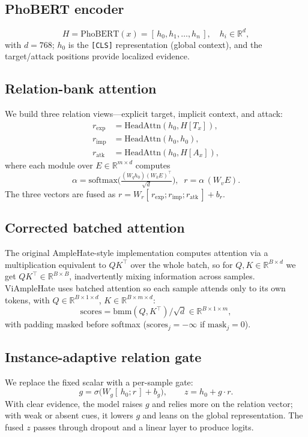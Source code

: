 \documentclass[11pt]{article}
\begin{document}
\subsection{PhoBERT encoder}
\begin{equation}
  H = \mathrm{PhoBERT}(x) = [\,h_0, h_1, \dots, h_n\,], \quad h_i \in \mathbb{R}^{d},
\end{equation}
with $d=768$; $h_0$ is the \texttt{[CLS]} representation (global context), and the target/attack positions provide localized evidence.

\subsection{Relation-bank attention}
We build three relation views---explicit target, implicit context, and attack:
\begin{align}
  r_{\mathrm{exp}} &= \mathrm{HeadAttn}(h_0, H[T_x]), \nonumber\\
  r_{\mathrm{imp}} &= \mathrm{HeadAttn}(h_0, h_0), \\
  r_{\mathrm{atk}} &= \mathrm{HeadAttn}(h_0, H[A_x]), \nonumber
\end{align}
where each module over $E \in \mathbb{R}^{m\times d}$ computes
\begin{equation}
  \alpha = \mathrm{softmax}\!\Big(\tfrac{(W_q h_0)(W_k E)^\top}{\sqrt d}\Big),\;\; r = \alpha\,(W_v E).
\end{equation}
The three vectors are fused as $r = W_r[\,r_{\mathrm{exp}};r_{\mathrm{imp}};r_{\mathrm{atk}}\,] + b_r$.

\subsection{Corrected batched attention}
The original AmpleHate-style implementation computes attention via a multiplication equivalent to $QK^\top$ over the whole batch, so for $Q,K\in\mathbb{R}^{B\times d}$ we get $QK^\top\in\mathbb{R}^{B\times B}$, inadvertently mixing information across samples. ViAmpleHate uses batched attention so each sample attends only to its own tokens, with $Q\in\mathbb{R}^{B\times 1\times d}$, $K\in\mathbb{R}^{B\times m\times d}$:
\begin{equation}
  \mathrm{scores} = \mathrm{bmm}(Q,K^\top)/\sqrt d \in\mathbb{R}^{B\times1\times m},
\end{equation}
with padding masked before softmax ($\mathrm{scores}_j=-\infty$ if $\mathrm{mask}_j=0$).

\subsection{Instance-adaptive relation gate}
We replace the fixed scalar with a per-sample gate:
\begin{equation}
  g = \sigma\big(W_g[\,h_0;r\,] + b_g\big),\qquad z = h_0 + g\cdot r.
\end{equation}
With clear evidence, the model raises $g$ and relies more on the relation vector; with weak or absent cues, it lowers $g$ and leans on the global representation. The fused $z$ passes through dropout and a linear layer to produce logits.
\end{document}
